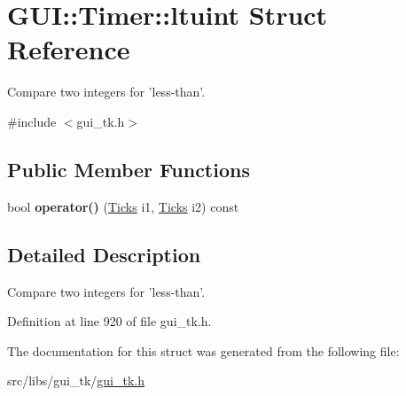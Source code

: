 \hypertarget{structGUI_1_1Timer_1_1ltuint}{\section{G\-U\-I\-:\-:Timer\-:\-:ltuint Struct Reference}
\label{structGUI_1_1Timer_1_1ltuint}
}


Compare two integers for 'less-\/than'.  




{\ttfamily \#include $<$gui\-\_\-tk.\-h$>$}

\subsection*{Public Member Functions}
\begin{DoxyCompactItemize}
\item 
\hypertarget{structGUI_1_1Timer_1_1ltuint_ac812e7336225709928959fdd35632405}{bool {\bfseries operator()} (\hyperlink{namespaceGUI_af396fee5d5c26b98218f5803f85e3b65}{Ticks} i1, \hyperlink{namespaceGUI_af396fee5d5c26b98218f5803f85e3b65}{Ticks} i2) const }\label{structGUI_1_1Timer_1_1ltuint_ac812e7336225709928959fdd35632405}

\end{DoxyCompactItemize}


\subsection{Detailed Description}
Compare two integers for 'less-\/than'. 

Definition at line 920 of file gui\-\_\-tk.\-h.



The documentation for this struct was generated from the following file\-:\begin{DoxyCompactItemize}
\item 
src/libs/gui\-\_\-tk/\hyperlink{gui__tk_8h}{gui\-\_\-tk.\-h}\end{DoxyCompactItemize}
